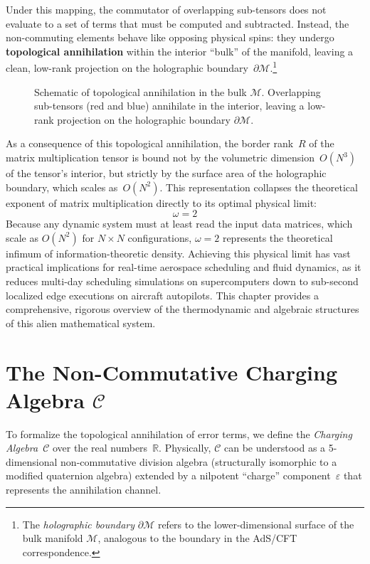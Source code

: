 \documentclass[11pt,a4paper]{book}
\begin{document}
Under this mapping, the commutator of overlapping sub-tensors does not evaluate to a set of terms that must be computed and subtracted. 
Instead, the non-commuting elements behave like opposing physical spins: they undergo \textbf{topological annihilation} within the interior ``bulk'' of the manifold, leaving a clean, low-rank projection on the holographic boundary~$\partial \mathcal{M}$.\footnote{The \textit{holographic boundary} $\partial \mathcal{M}$ refers to the lower-dimensional surface of the bulk manifold $\mathcal{M}$, analogous to the boundary in the AdS/CFT correspondence.}

\begin{figure}[h]
\centering
\caption{Schematic of topological annihilation in the bulk $\mathcal{M}$. Overlapping sub-tensors (red and blue) annihilate in the interior, leaving a low-rank projection on the holographic boundary $\partial \mathcal{M}$.}
\label{fig:topological_annihilation}
\end{figure}

As a consequence of this topological annihilation, the border rank~$R$ of the matrix multiplication tensor is bound not by the volumetric dimension~$O(N^3)$ of the tensor's interior, but strictly by the surface area of the holographic boundary, which scales as~$O(N^2)$. 
This representation collapses the theoretical exponent of matrix multiplication directly to its optimal physical limit:
\begin{equation}
\omega = 2
\end{equation}
Because any dynamic system must at least read the input data matrices, which scale as $O(N^2)$ for $N \times N$ configurations, $\omega = 2$ represents the theoretical infimum of information-theoretic density. Achieving this physical limit has vast practical implications for real-time aerospace scheduling and fluid dynamics, as it reduces multi-day scheduling simulations on supercomputers down to sub-second localized edge executions on aircraft autopilots. This chapter provides a comprehensive, rigorous overview of the thermodynamic and algebraic structures of this alien mathematical system.

\section{The Non-Commutative Charging Algebra $\mathcal{C}$}
\label{sec:charging_algebra_def}

To formalize the topological annihilation of error terms, we define the \textit{Charging Algebra}~$\mathcal{C}$ over the real numbers~$\mathbb{R}$. 
Physically, $\mathcal{C}$ can be understood as a 5-dimensional non-commutative division algebra (structurally isomorphic to a modified quaternion algebra) extended by a nilpotent ``charge'' component~$\varepsilon$ that represents the annihilation channel.
\end{document}
